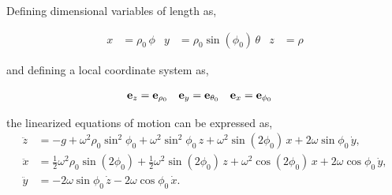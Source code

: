\documentclass[12pt]{article}
\begin{document}
Defining dimensional variables of length as,

\begin{align}
  x &= \rho_0\,\phi & y &= \rho_0\sin(\phi_0)\,\theta & z &= \rho
\end{align}

and defining a local coordinate system as,

\begin{align}
  \vb{e}_z &= \vb{e}_{\rho_0} &
  \vb{e}_y &= \vb{e}_{\theta_0} &
  \vb{e}_x &= \vb{e}_{\phi_0}
\end{align}

the linearized equations of motion can be expressed as,
\begin{equation}
  \begin{aligned}
    \ddot{z}
    &=
    -g
    +\omega^2\rho_0\sin^2\phi_0
    +\omega^2\sin^2\phi_0\,z
    +\omega^2\sin(2\phi_0)\,x
    +2\omega\sin\phi_0\,\dot{y},
    \\
    \ddot{x}
    &=
    \frac{1}{2}\omega^2\rho_0\sin(2\phi_0)
    +\frac{1}{2}\omega^2\sin(2\phi_0)\,z
    +\omega^2\cos(2\phi_0)\,x
    +2\omega\cos\phi_0\,\dot{y},
    \\
    \ddot{y}
    &=
    -2\omega\sin\phi_0\,\dot{z}
    -2\omega\cos\phi_0\,\dot{x}.
  \end{aligned}
  \label{earth:local-cartesian-equations}
\end{equation}
\end{document}
